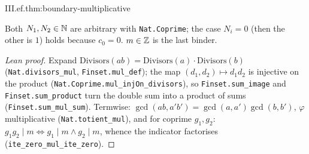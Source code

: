 \begin{theorem}
\end{theorem}
\begin{tfformal}{III.ef.thm:boundary-multiplicative}
\begin{tffidelity}
Both $N_1,N_2\in\mathbb{N}$ are arbitrary with \texttt{Nat.Coprime}; the case $N_i=0$ (then the other is $1$) holds because $c_0=0$. $m\in\mathbb{Z}$ is the last binder.
\end{tffidelity}
\end{tfformal}
\begin{proof}[Lean proof]
Expand $\mathrm{Divisors}(ab)=\mathrm{Divisors}(a)\cdot\mathrm{Divisors}(b)$ (\texttt{Nat.divisors\_mul}, \texttt{Finset.mul\_def}); the map $(d_1,d_2)\mapsto d_1d_2$ is injective on the product (\texttt{Nat.Coprime.mul\_injOn\_divisors}), so \texttt{Finset.sum\_image} and \texttt{Finset.sum\_product} turn the double sum into a product of sums (\texttt{Finset.sum\_mul\_sum}). Termwise: $\gcd(ab,a'b')=\gcd(a,a')\gcd(b,b')$, $\varphi$ multiplicative (\texttt{Nat.totient\_mul}), and for coprime $g_1,g_2$: $g_1g_2\mid m\iff g_1\mid m\wedge g_2\mid m$, whence the indicator factorises (\texttt{ite\_zero\_mul\_ite\_zero}).
\end{proof}

